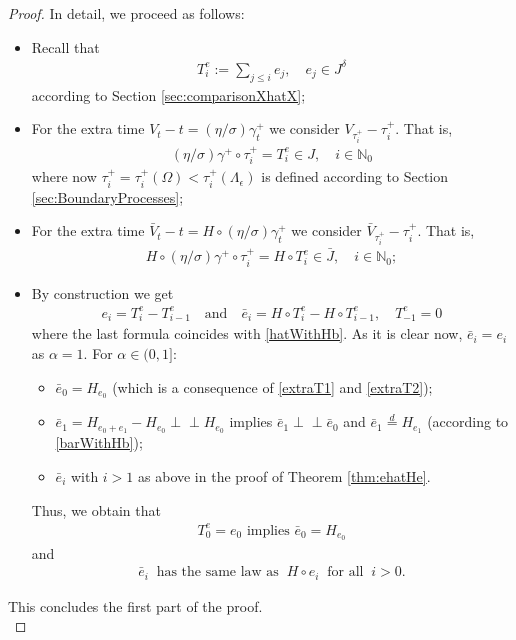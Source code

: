 \documentclass[11pt,a4paper]{article}
\newcommand{\indep}{\perp \! \! \! \perp}
\begin{document}
\begin{proof}
In detail, we proceed as follows:
\begin{itemize}
\item[-] Recall that
\begin{align*}
T^e_i := \sum_{j \leq i} e_j, \quad e_j \in J^\delta
\end{align*}
according to Section \ref{sec:comparisonXhatX};
\item[-] For the extra time $V_t - t = (\eta/\sigma) \gamma^+_t$ we consider $V_{\tau^+_i} - \tau^+_i$. That is,
\begin{align}
(\eta/\sigma) \gamma^+ \circ \tau^+_i = T^e_i \in J, \quad i \in \mathbb{N}_0
\label{extraT1}
\end{align} 
where now $\tau^+_i=\tau^+_i(\Omega) < \tau^+_i(\Lambda_\epsilon)$ is defined according to Section \ref{sec:BoundaryProcesses};
\item[-] For the extra time $\bar{V}_t - t = H \circ (\eta/\sigma) \gamma^+_t$ we consider $\bar{V}_{\tau^+_i} - \tau^+_i$. That is,
\begin{align}
H \circ (\eta/\sigma) \gamma^+ \circ \tau^+_i = H \circ T^e_i \in \bar{J}, \quad i \in \mathbb{N}_0 ;
\label{extraT2}
\end{align} 
\item[-] By construction we get
\begin{align}
e_i = T^e_i - T^e_{i-1} \quad \textrm{and} \quad \bar{e}_i = H \circ T^e_i - H \circ T^e_{i-1}, \quad T^e_{-1}=0
\label{barWithHb}
\end{align}
where the last formula coincides with \eqref{hatWithHb}. As it is clear now, $\bar{e}_i = e_i$ as $\alpha=1$. For $\alpha \in (0,1]$:
\begin{itemize}
\item[-] $\bar{e}_0 = H_{e_0}$ (which is a consequence of \eqref{extraT1} and \eqref{extraT2});\\
\item[-] $\bar{e}_1 = H_{e_0+e_1} - H_{e_0} \indep H_{e_0}$ implies $\bar{e}_1 \indep \bar{e}_0$ and $\bar{e}_1 \stackrel{d}{=} H_{e_1}$ (according to \eqref{barWithHb});\\
\item[-] $\bar{e}_i$ with $i>1$ as above in the proof of Theorem \ref{thm:ehatHe}.
\end{itemize}
Thus, we obtain that
\begin{align*}
\textrm{$T^e_0 = e_0$ implies $\bar{e}_0 = H_{e_0}$}
\end{align*}
and
\begin{align*}
\bar{e}_i \;\; \textrm{has the same law as} \;\;  H \circ e_i \;\;  \textrm{for all} \;\; i > 0.
\end{align*}
\end{itemize}
This concludes the first part of the proof.\\


\end{proof}
\end{document}
